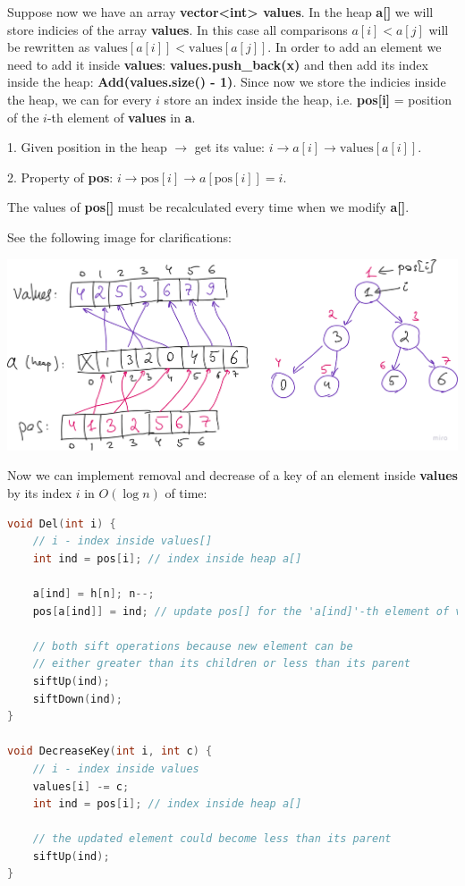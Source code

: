 
Suppose now we have an array \textbf{vector<int> values}. In the heap \textbf{a[]} we will store indicies of the array \textbf{values}. In this case all comparisons $a[i] < a[j]$ will be rewritten as $\text{values}[a[i]] < \text{values}[a[j]]$. In order to add an element we need to add it inside \textbf{values}: \textbf{values.push\_back(x)} and then add its index inside the heap: \textbf{Add(values.size() - 1)}. Since now we store the indicies inside the heap, we can for every $i$ store an index inside the heap, i.e. \textbf{pos[i]} = position of the $i$-th element of \textbf{values} in \textbf{a}.

1. Given position in the heap $\to$ get its value: $i \to a[i] \to \text{values}[a[i]]$.

2. Property of \textbf{pos}: $i \to \text{pos}[i] \to a[\text{pos}[i]] = i$.

The values of \textbf{pos[]} must be recalculated every time when we modify \textbf{a[]}.

See the following image for clarifications:

\begin{center}
    \includegraphics[scale=0.25]{./assets/12-binary-heap/3.png}
\end{center}

Now we can implement removal and decrease of a key of an element inside \textbf{values} by its index $i$ in $O(\log{n})$ of time:

\begin{lstlisting}[language=C++]
void Del(int i) {
    // i - index inside values[]
    int ind = pos[i]; // index inside heap a[]

    a[ind] = h[n]; n--;
    pos[a[ind]] = ind; // update pos[] for the 'a[ind]'-th element of values[]

    // both sift operations because new element can be
    // either greater than its children or less than its parent
    siftUp(ind);
    siftDown(ind);
}

void DecreaseKey(int i, int c) {
    // i - index inside values
    values[i] -= c;
    int ind = pos[i]; // index inside heap a[]

    // the updated element could become less than its parent
    siftUp(ind);
}
\end{lstlisting}


